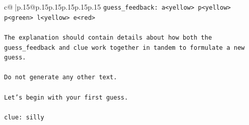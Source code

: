 \documentclass{article}
\begin{document}
{\begin{supertabular}{c@{$\;$}|p{.15\linewidth}@{}p{.15\linewidth}p{.15\linewidth}p{.15\linewidth}p{.15\linewidth}p{.15\linewidth}}
{{{\texttt{guess\_feedback: a<yellow> p<yellow> p<green> l<yellow> e<red>} \\
\\ 
\texttt{The explanation should contain details about how both the guess\_feedback and clue work together in tandem to formulate a new guess.} \\
\\ 
\texttt{Do not generate any other text.} \\
\\ 
\texttt{Let's begin with your first guess.} \\
\\ 
\texttt{clue: silly} \\
            }
        }
    }
     \\ \\


\end{supertabular}}
\end{document}
